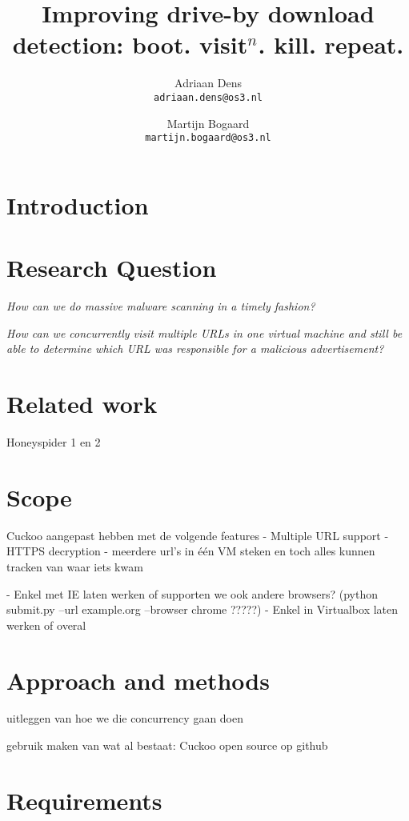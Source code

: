 \documentclass{scrartcl}
\title{Improving drive-by download detection: boot. visit$^n$. kill. repeat.}
\author{
  Adriaan Dens\\
   \texttt{adriaan.dens@os3.nl}
  \and
  Martijn Bogaard\\
   \texttt{martijn.bogaard@os3.nl}
}
\begin{document}
\maketitle
\newpage

\section{Introduction}



\section{Research Question}

\textit{How can we do massive malware scanning in a timely fashion?}

\textit{How can we concurrently visit multiple URLs in one virtual machine and still be able to determine which URL was responsible for a malicious advertisement?}
\\
\section{Related work}



Honeyspider 1 en 2

\section{Scope}

	Cuckoo aangepast hebben met de volgende features
		- Multiple URL support
		- HTTPS decryption
		- meerdere url's in één VM steken en toch alles kunnen tracken van waar iets kwam


 - Enkel met IE laten werken of supporten we ook andere browsers?
	(python submit.py --url example.org --browser chrome ?????)
 - Enkel in Virtualbox laten werken of overal


\section{Approach and methods}

uitleggen van hoe we die concurrency gaan doen

gebruik maken van wat al bestaat: Cuckoo
open source op github


\section{Requirements}
\end{document}

